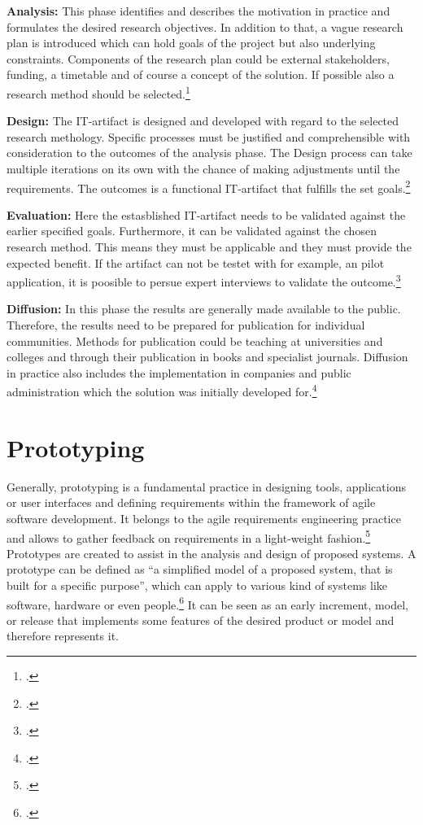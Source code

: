 \textbf{Analysis:} This phase identifies and describes the motivation in practice and formulates the desired research objectives.
In addition to that, a vague research plan is introduced which can hold goals of the project but also underlying constraints. 
Components of the research plan could be external stakeholders, funding, a timetable and of course a concept of the solution.
If possible also a research method should be selected.\footcite[cf.][4]{oesterleMemorandumZurGestaltungsorientierten2010}

\textbf{Design:} The \ac{IT}-artifact is designed and developed with regard to the selected research methology. 
Specific processes must be justified and comprehensible with consideration to the outcomes of the analysis phase.
The Design process can take multiple iterations on its own with the chance of making adjustments until the requirements.
The outcomes is a functional \ac{IT}-artifact that fulfills the set goals.\footcite[cf.][279]{oesterleKonsortialforschung2010}

\textbf{Evaluation:} Here the estasblished \ac{IT}-artifact needs to be validated against the earlier specified goals. 
Furthermore, it can be validated against the chosen research method. 
This means they must be applicable and they must provide the expected benefit.
If the artifact can not be testet with for example, an pilot application, it is poosible to persue expert interviews to validate the outcome.\footcite[cf.][279]{oesterleKonsortialforschung2010}

\textbf{Diffusion:} In this phase the results are generally made available to the public.
Therefore, the results need to be prepared for publication for individual communities.
Methods for publication could be teaching at universities and colleges and through their publication in books and specialist journals.
Diffusion in practice also includes the implementation in companies and public administration which the solution was initially developed for.\footcite[cf.][5]{oesterleMemorandumZurGestaltungsorientierten2010}

\section{Prototyping}

Generally, prototyping is a fundamental practice in designing tools, applications or user interfaces and defining requirements within the framework of agile software development.
It belongs to the agile requirements engineering practice and allows to gather feedback on requirements in a light-weight fashion.\footcite[cf.][1]{bjarnasonModelSoftwarePrototyping2021a}
Prototypes are created to assist in the analysis and design of proposed systems.
A prototype can be defined as ``a simplified model of a proposed system, that is built for a specific purpose'', which can apply to various kind of systems like software, hardware or even people.\footcite[][470]{luqiRapidSoftwarePrototyping1992}
It can be seen as an early increment, model, or release that implements some features of the desired product or model and therefore represents it. 

